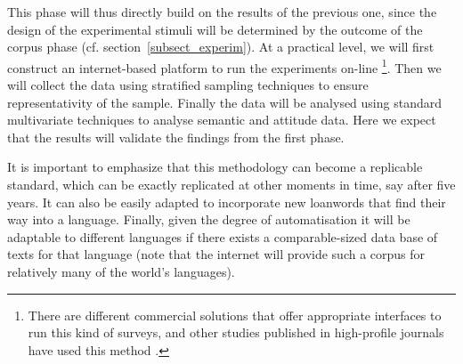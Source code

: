 \documentclass[a4paper]{article}
\begin{document}
This phase will thus directly build on the results of the previous one, since the design of the experimental stimuli will be determined by the outcome of the corpus phase (cf. section~\ref{subsect_experim}).
At a practical level, we will first construct an internet-based platform to run the experiments on-line%
\footnote{There are different commercial solutions that offer appropriate interfaces to run this kind of surveys, and other studies published in high-profile journals have used this method \citep[e.g.,][]{Scontras2012}.}.
Then we will collect the data using stratified sampling techniques to ensure representativity of the sample.
Finally the data will be analysed using standard multivariate techniques to analyse semantic and attitude data.
Here we expect that the results will validate the findings from the first phase.

It is important to emphasize that this methodology can become a replicable standard, which can be exactly replicated at other moments in time, say after five years. 
It can also be easily adapted to incorporate new loanwords that find their way into a language.
Finally, given the degree of automatisation it will be adaptable to different languages if there exists a comparable-sized data base of texts for that language (note that the internet will provide such a corpus for relatively many of the world's languages).



	
\end{document}
